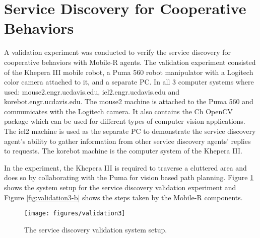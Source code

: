   \section{Service Discovery for Cooperative Behaviors} \label{sec:val_3}
    A validation experiment was conducted to verify the service discovery for 
      cooperative behaviors with Mobile-R agents.
    The validation experiment consisted of the Khepera III mobile robot, a Puma 
      560 robot manipulator with a Logitech color camera attached to it, and
      a separate PC.
    In all 3 computer systems where used: mouse2.engr.ucdavis.edu, 
       iel2.engr.ucdavis.edu and korebot.engr.ucdavis.edu.
    The mouse2 machine is attached to the Puma 560 and communicates with the 
      Logitech camera.
    It also contains the Ch OpenCV package which can be used for different
      types of computer vision applications.
    The iel2 machine is used as the separate PC to demonstrate the service 
      discovery agent's ability to gather information from other service 
      discovery agents' replies to requests.
    The korebot machine is the computer system of the Khepera III.

    In the experiment, the Khepera III is required to traverse a cluttered 
      area and does so by collaborating with the Puma for vision based path 
      planning.
    Figure \ref{fig:validation3} shows the system setup for the service 
      discovery validation experiment and Figure \ref{fig:validation3-b} shows
      the steps taken by the Mobile-R components.
    \begin{figure}%
      \centerline{\texttt{[image: figures/validation3]}}
      \caption{The service discovery validation system setup.}
      \label{fig:validation3}
    \end{figure}

